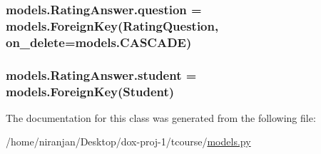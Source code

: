 \subsubsection[{\texorpdfstring{question}{question}}]{\setlength{\rightskip}{0pt plus 5cm}models.\+Rating\+Answer.\+question = models.\+Foreign\+Key({\bf Rating\+Question}, on\+\_\+delete=models.\+C\+A\+S\+C\+A\+DE)\hspace{0.3cm}{\ttfamily [static]}}\hypertarget{classmodels_1_1_rating_answer_a8a0ec04798b69f11a6e6373dd1f42513}{}\label{classmodels_1_1_rating_answer_a8a0ec04798b69f11a6e6373dd1f42513}
\subsubsection[{\texorpdfstring{student}{student}}]{\setlength{\rightskip}{0pt plus 5cm}models.\+Rating\+Answer.\+student = models.\+Foreign\+Key({\bf Student})\hspace{0.3cm}{\ttfamily [static]}}\hypertarget{classmodels_1_1_rating_answer_a23088d51ac44aad2ca654cfe0876240d}{}\label{classmodels_1_1_rating_answer_a23088d51ac44aad2ca654cfe0876240d}


The documentation for this class was generated from the following file\+:\begin{DoxyCompactItemize}
\item 
/home/niranjan/\+Desktop/dox-\/proj-\/1/tcourse/\hyperlink{models_8py}{models.\+py}\end{DoxyCompactItemize}

